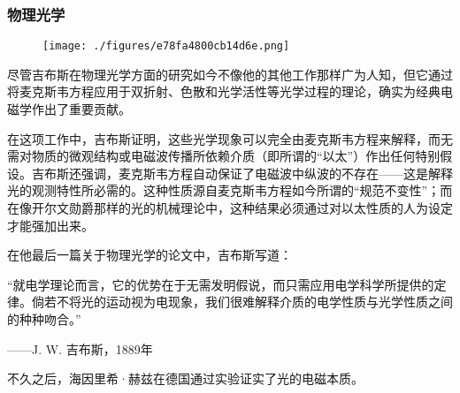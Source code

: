 \subsubsection{物理光学}
\begin{figure}[ht]
\centering
\texttt{[image: ./figures/e78fa4800cb14d6e.png]}
\caption{} \label{fig_QSY_9}
\end{figure}
尽管吉布斯在物理光学方面的研究如今不像他的其他工作那样广为人知，但它通过将麦克斯韦方程应用于双折射、色散和光学活性等光学过程的理论，确实为经典电磁学作出了重要贡献。

在这项工作中，吉布斯证明，这些光学现象可以完全由麦克斯韦方程来解释，而无需对物质的微观结构或电磁波传播所依赖介质（即所谓的“以太”）作出任何特别假设。吉布斯还强调，麦克斯韦方程自动保证了电磁波中纵波的不存在——这是解释光的观测特性所必需的。这种性质源自麦克斯韦方程如今所谓的“规范不变性”；而在像开尔文勋爵那样的光的机械理论中，这种结果必须通过对以太性质的人为设定才能强加出来。

在他最后一篇关于物理光学的论文中，吉布斯写道：

“就电学理论而言，它的优势在于无需发明假说，而只需应用电学科学所提供的定律。倘若不将光的运动视为电现象，我们很难解释介质的电学性质与光学性质之间的种种吻合。”

——J. W. 吉布斯，1889年

不久之后，海因里希·赫兹在德国通过实验证实了光的电磁本质。

